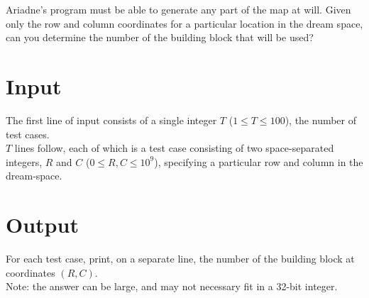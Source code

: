 Ariadne's program must be able to generate any part of the map at will. Given only the row and column coordinates for a particular location in the dream space, can you determine the number of the building block that will be used?

\section*{Input}
The first line of input consists of a single integer $T$ ($1 \leq T \leq 100$), the number of test cases.\\
$T$ lines follow, each of which is a test case consisting of two space-separated integers, $R$ and $C$ ($0 \leq R, C \leq 10^{9}$), specifying a particular row and column in the dream-space.\\

\section*{Output}
For each test case, print, on a separate line, the number of the building block at coordinates $(R, C)$.\\
Note: the answer can be large, and may not necessary fit in a 32-bit integer.\\
